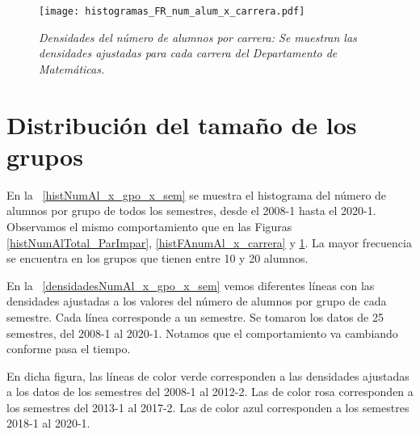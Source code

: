 \begin{figure}[H]
\centering
\texttt{[image: histogramas\_FR\_num\_alum\_x\_carrera.pdf]} %
\caption[\textit{Densidades del número de alumnos por carrera}]{\textit{Densidades del número de alumnos por carrera: Se muestran las densidades ajustadas para cada carrera del Departamento de Matemáticas.}}\label{histFRnumAl_x_carrera}
\end{figure}


\section{Distribución del tamaño de los grupos} \label{DitribTamGpos}

En la \figurename{~\ref{histNumAl_x_gpo_x_sem}} se muestra el histograma del número de alumnos por grupo de todos los semestres, desde el 2008-1 hasta el 2020-1. Observamos el mismo comportamiento que en las Figuras \ref{histNumAlTotal_ParImpar}, \ref{histFAnumAl_x_carrera} y \ref{histFRnumAl_x_carrera}. La mayor frecuencia se encuentra en los grupos que tienen entre 10 y 20 alumnos.



En la \figurename{~\ref{densidadesNumAl_x_gpo_x_sem}} vemos diferentes líneas con las densidades ajustadas a los valores del número de alumnos por grupo de cada semestre. Cada línea corresponde a un semestre. Se tomaron los datos de 25 semestres, del 2008-1 al 2020-1. Notamos que el comportamiento va cambiando conforme pasa el tiempo.

En dicha figura, las líneas de color verde corresponden a las densidades ajustadas a los datos de los semestres del 2008-1 al 2012-2. Las de color rosa corresponden a los semestres del 2013-1 al 2017-2. Las de color azul corresponden a los semestres 2018-1 al 2020-1.

